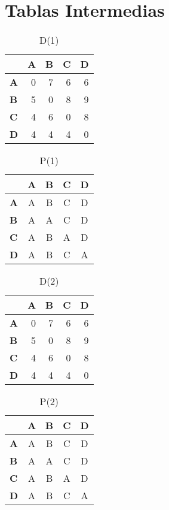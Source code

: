 \documentclass{article}
\begin{document}
\section*{Tablas Intermedias}
\begin{table}[H]\centering
\caption{D(1)}
\begin{tabular}{l r r r r}
\toprule
 & \textbf{A} & \textbf{B} & \textbf{C} & \textbf{D}\\\midrule
\textbf{A} & 0 & 7 & 6 & 6 \\
\textbf{B} & 5 & 0 & 8 & 9 \\
\textbf{C} & 4 & 6 & 0 & 8 \\
\textbf{D} & 4 & 4 & 4 & 0 \\
\bottomrule
\end{tabular}
\end{table}

\begin{table}[H]\centering
\caption{P(1)}
\begin{tabular}{l c c c c}
\toprule
 & \textbf{A} & \textbf{B} & \textbf{C} & \textbf{D}\\\midrule
\textbf{A} & \cellcolor{yellow!30}A & B & C & D \\
\textbf{B} & A & \cellcolor{yellow!30}A & C & D \\
\textbf{C} & A & B & \cellcolor{yellow!30}A & D \\
\textbf{D} & A & B & C & \cellcolor{yellow!30}A \\
\bottomrule
\end{tabular}
\end{table}

\begin{table}[H]\centering
\caption{D(2)}
\begin{tabular}{l r r r r}
\toprule
 & \textbf{A} & \textbf{B} & \textbf{C} & \textbf{D}\\\midrule
\textbf{A} & 0 & 7 & 6 & 6 \\
\textbf{B} & 5 & 0 & 8 & 9 \\
\textbf{C} & 4 & 6 & 0 & 8 \\
\textbf{D} & 4 & 4 & 4 & 0 \\
\bottomrule
\end{tabular}
\end{table}

\begin{table}[H]\centering
\caption{P(2)}
\begin{tabular}{l c c c c}
\toprule
 & \textbf{A} & \textbf{B} & \textbf{C} & \textbf{D}\\\midrule
\textbf{A} & A & B & C & D \\
\textbf{B} & A & A & C & D \\
\textbf{C} & A & B & A & D \\
\textbf{D} & A & B & C & A \\
\bottomrule
\end{tabular}
\end{table}
\end{document}
